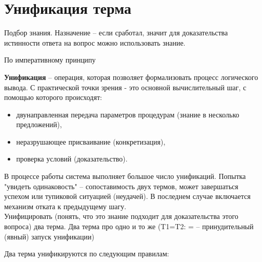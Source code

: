 \documentclass[12pt]{report}
\begin{document}
\section*{Унификация терма}

Подбор знания. Назначение -- если сработал, значит для доказательства истинности ответа на вопрос можно использовать знание.

По императивному принципу



\textbf{Унификация} – операция, которая позволяет формализовать процесс логического вывода. С практической точки зрения  - это основной вычислительный шаг, с помощью которого происходят:
\begin{itemize}
	\item двунаправленная передача параметров процедурам (знание в несколько предложений),
	\item неразрушающее присваивание (конкретизация),
	\item проверка условий (доказательство).
\end{itemize}

В процессе работы система выполняет большое число унификаций.  Попытка "увидеть одинаковость" – сопоставимость двух термов, может завершаться успехом или тупиковой ситуацией (неудачей). В последнем случае включается механизм отката к предыдущему шагу.\\



Унифицировать (понять, что это знание подходит для доказательства этого вопроса) два терма. Два терма про одно и то же (T1=T2: = -- принудительный (явный) запуск  унификации)




Два терма унификируются по следующим правилам:
\end{document}
